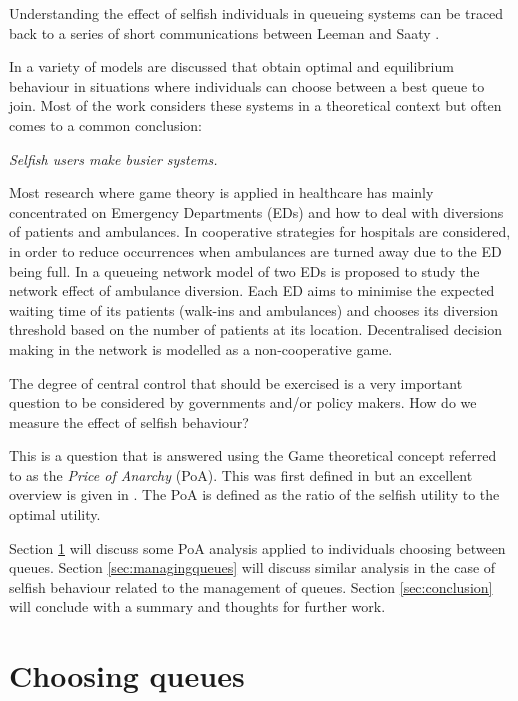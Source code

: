 \documentclass[a4paper,11pt]{article}
\begin{document}
Understanding the effect of selfish individuals in queueing systems can be traced back to a series of short communications between Leeman \cite{Leeman1964,Leeman1965} and Saaty \cite{Saaty1965}.

In \cite{Adler1969,Bell1983,Edelson1971,Knudsen1972,Luski1976,Naor1969,Yechiali1972} a variety of models are discussed that obtain optimal and equilibrium behaviour in situations where individuals can choose between a best queue to join.
Most of the work considers these systems in a theoretical context but often comes to a common conclusion:

\begin{center}
\textit{Selfish users make busier systems.}
\end{center}

Most research where game theory is applied in healthcare has mainly concentrated on Emergency Departments (EDs) and how to deal with diversions of patients and ambulances.
In \cite{Hagtvedt2009} cooperative strategies for hospitals are considered, in order to reduce occurrences when ambulances are turned away due to the ED being full.
In \cite{Deo2011} a queueing network model of two EDs is proposed to study the network effect of ambulance diversion.
Each ED aims to minimise the expected waiting time of its patients (walk-ins and ambulances) and chooses its diversion threshold based on the number of patients at its location.
Decentralised decision making in the network is modelled as a non-cooperative game.

The degree of central control that should be exercised is a very important question to be considered by governments and/or policy makers.
How do we measure the effect of selfish behaviour?

This is a question that is answered using the Game theoretical concept referred to as the \textit{Price of Anarchy} (PoA).
This was first defined in \cite{Koutsoupias2009} but an excellent overview is given in \cite{Roughgarden2005}.
The PoA is defined as the ratio of the selfish utility to the optimal utility.

Section \ref{sec:choosingqueues} will discuss some PoA analysis applied to individuals choosing between queues.
Section \ref{sec:managingqueues} will discuss similar analysis in the case of selfish behaviour related to the management of queues.
Section \ref{sec:conclusion} will conclude with a summary and thoughts for further work.

\section{Choosing queues}\label{sec:choosingqueues}
\end{document}
